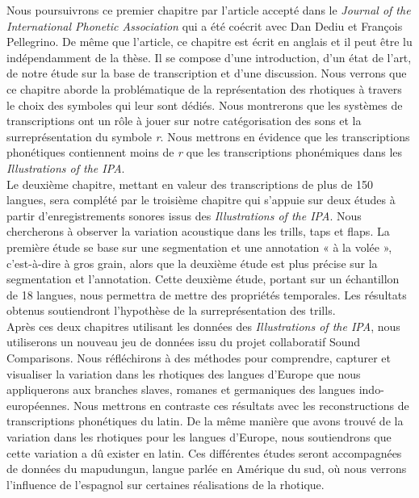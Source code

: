 Nous poursuivrons ce premier chapitre par l'article accepté dans le \textit{Journal of the International Phonetic Association} qui a été coécrit avec Dan Dediu et François Pellegrino. De même que l'article, ce chapitre est écrit en anglais et il peut être lu indépendamment de la thèse. Il se compose d'une introduction, d'un état de l'art, de notre étude sur la base de transcription et d'une discussion. Nous verrons que ce chapitre aborde la problématique de la représentation des rhotiques à travers le choix des symboles qui leur sont dédiés. Nous montrerons que les systèmes de transcriptions ont un rôle à jouer sur notre catégorisation des sons et la surreprésentation du symbole \textit{r}. Nous mettrons en évidence que les transcriptions phonétiques contiennent moins de \textit{r} que les transcriptions phonémiques dans les \textit{Illustrations of the IPA}.\\

Le deuxième chapitre, mettant en valeur des transcriptions de plus de 150 langues, sera complété par le troisième chapitre qui s'appuie sur deux études à partir d'enregistrements sonores issus des \textit{Illustrations of the IPA}. Nous chercherons à observer la variation acoustique dans les trills, taps et flaps. La première étude se base sur une segmentation et une annotation « à la volée », c'est-à-dire à gros grain, alors que la deuxième étude est plus précise sur la segmentation et l'annotation. Cette deuxième étude, portant sur un échantillon de 18 langues, nous permettra de mettre des propriétés temporales. Les résultats obtenus soutiendront l'hypothèse de la surreprésentation des trills.\\

Après ces deux chapitres utilisant les données des \textit{Illustrations of the IPA}, nous utiliserons un nouveau jeu de données issu du projet collaboratif Sound Comparisons. Nous réfléchirons à des méthodes pour comprendre, capturer et visualiser la variation dans les rhotiques des langues d'Europe que nous appliquerons aux branches slaves, romanes et germaniques des langues indo-européennes. Nous mettrons en contraste ces résultats avec les reconstructions de transcriptions phonétiques du latin. De la même manière que avons trouvé de la variation dans les rhotiques pour les langues d'Europe, nous soutiendrons que cette variation a dû exister en latin. Ces différentes études seront accompagnées de données du mapudungun, langue parlée en Amérique du sud, où nous verrons l'influence de l'espagnol sur certaines réalisations de la rhotique.\\

